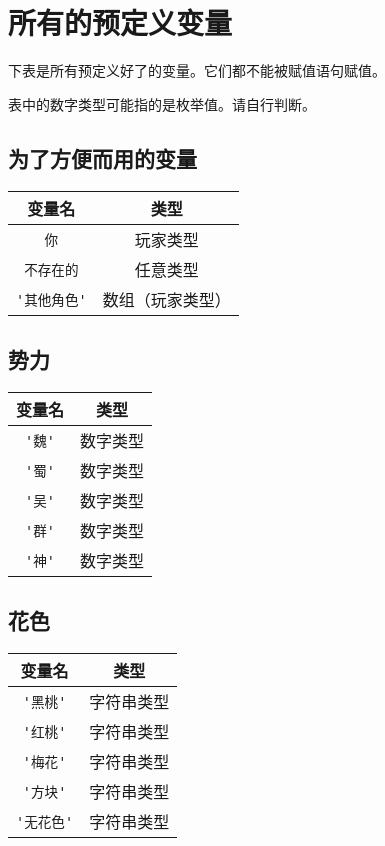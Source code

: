 \chapter{所有的预定义变量}

下表是所有预定义好了的变量。它们都不能被赋值语句赋值。

表中的数字类型可能指的是枚举值。请自行判断。

\section{为了方便而用的变量}
\begin{center}
\begin{longtable}{|c|c|}
\hline \textbf{变量名} & \textbf{类型} \\
\hline \verb|你| & 玩家类型 \\
\hline \verb|不存在的| & 任意类型 \\
\hline \verb|'其他角色'| & 数组（玩家类型） \\
\hline
\end{longtable}
\end{center}

\section{势力}

\begin{center}
\begin{longtable}{|c|c|}
\hline \textbf{变量名} & \textbf{类型} \\
\hline \verb|'魏'| & 数字类型 \\
\hline \verb|'蜀'| & 数字类型 \\
\hline \verb|'吴'| & 数字类型 \\
\hline \verb|'群'| & 数字类型 \\
\hline \verb|'神'| & 数字类型 \\
\hline
\end{longtable}
\end{center}

\section{花色}

\begin{center}
\begin{longtable}{|c|c|}
\hline \textbf{变量名} & \textbf{类型} \\
\hline \verb|'黑桃'| & 字符串类型 \\
\hline \verb|'红桃'| & 字符串类型 \\
\hline \verb|'梅花'| & 字符串类型 \\
\hline \verb|'方块'| & 字符串类型 \\
\hline \verb|'无花色'| & 字符串类型 \\
\hline
\end{longtable}
\end{center}

